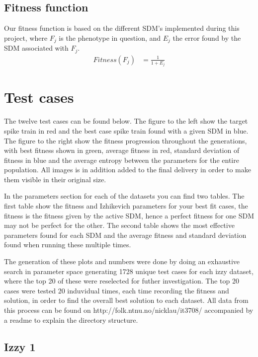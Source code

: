 \documentclass[10pt]{article}
\begin{document}
	\subsection{Fitness function}\label{sec:fitness}
		Our fitness function is based on the different SDM's implemented during this project, where $F_j$ is the phenotype in question, and $E_j$ the error found by the SDM associated with $F_j$.
		\begin{align}
			Fitness(F_j) &= \frac{1}{1+E_j}\nonumber
		\end{align}
\section{Test cases}\label{sec:test}
	The twelve test cases can be found below. The figure to the left show the target spike train in red and the best case spike train found with a given SDM in blue. The figure to the right show the fitness progression throughout the generations, with best fitness shown in green, average fitness in red, standard deviation of fitness in blue and the average entropy between the parameters for the entire population. All images is in addition added to the final delivery in order to make them visible in their original size. 
	
	In the parameters section for each of the datasets you can find two tables. The first table show the fitness and Izhikevich parameters for your best fit cases, the fitness is the fitness given by the active SDM, hence a perfect fitness for one SDM may not be perfect for the other. The second table shows the most effective parameters found for each SDM and the average fitness and standard deviation found when running these multiple times. 
	
	The generation of these plots and numbers were done by doing an exhaustive search in parameter space generating 1728 unique test cases for each izzy dataset, where the top 20 of these were reselected for futher investigation. The top 20 cases were tested 20 induvidual times, each time recording the fitness and solution, in order to find the overall best solution to each dataset. All data from this process can be found on http://folk.ntnu.no/nicklau/it3708/ accompanied by a readme to explain the directory structure.
	
	\subsection{Izzy 1}
\end{document}
